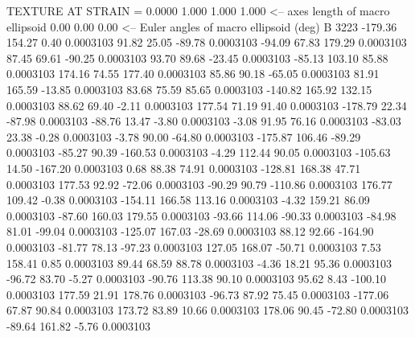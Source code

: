 TEXTURE AT STRAIN =    0.0000
   1.000   1.000   1.000  <-- axes length of macro ellipsoid
    0.00    0.00    0.00  <-- Euler angles of macro ellipsoid (deg)
B      3223
     -179.36      154.27        0.40     0.0003103
       91.82       25.05      -89.78     0.0003103
      -94.09       67.83      179.29     0.0003103
       87.45       69.61      -90.25     0.0003103
       93.70       89.68      -23.45     0.0003103
      -85.13      103.10       85.88     0.0003103
      174.16       74.55      177.40     0.0003103
       85.86       90.18      -65.05     0.0003103
       81.91      165.59      -13.85     0.0003103
       83.68       75.59       85.65     0.0003103
     -140.82      165.92      132.15     0.0003103
       88.62       69.40       -2.11     0.0003103
      177.54       71.19       91.40     0.0003103
     -178.79       22.34      -87.98     0.0003103
      -88.76       13.47       -3.80     0.0003103
       -3.08       91.95       76.16     0.0003103
      -83.03       23.38       -0.28     0.0003103
       -3.78       90.00      -64.80     0.0003103
     -175.87      106.46      -89.29     0.0003103
      -85.27       90.39     -160.53     0.0003103
       -4.29      112.44       90.05     0.0003103
     -105.63       14.50     -167.20     0.0003103
        0.68       88.38       74.91     0.0003103
     -128.81      168.38       47.71     0.0003103
      177.53       92.92      -72.06     0.0003103
      -90.29       90.79     -110.86     0.0003103
      176.77      109.42       -0.38     0.0003103
     -154.11      166.58      113.16     0.0003103
       -4.32      159.21       86.09     0.0003103
      -87.60      160.03      179.55     0.0003103
      -93.66      114.06      -90.33     0.0003103
      -84.98       81.01      -99.04     0.0003103
     -125.07      167.03      -28.69     0.0003103
       88.12       92.66     -164.90     0.0003103
      -81.77       78.13      -97.23     0.0003103
      127.05      168.07      -50.71     0.0003103
        7.53      158.41        0.85     0.0003103
       89.44       68.59       88.78     0.0003103
       -4.36       18.21       95.36     0.0003103
      -96.72       83.70       -5.27     0.0003103
      -90.76      113.38       90.10     0.0003103
       95.62        8.43     -100.10     0.0003103
      177.59       21.91      178.76     0.0003103
      -96.73       87.92       75.45     0.0003103
     -177.06       67.87       90.84     0.0003103
      173.72       83.89       10.66     0.0003103
      178.06       90.45      -72.80     0.0003103
      -89.64      161.82       -5.76     0.0003103
